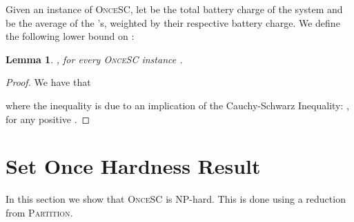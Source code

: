 \documentclass[11pt]{article}
\newtheorem{lemma}{Lemma}
\newcommand{\sosc}{\textsc{OnceSC}\xspace}
\newcommand{\partition}{\textsc{Partition}\xspace}
\begin{document}
Given an instance  of \sosc, let  be the
total battery charge of the system and  be the average of the 's, weighted by
their respective battery charge.  We define the following lower bound
on :


\begin{lemma}
\label{lemma:convex}
, for every \sosc instance .
\end{lemma}
\begin{proof}
We have that

where the inequality is due to 
an implication of the Cauchy-Schwarz Inequality: , for any
positive .
\end{proof}

\iffalse 

\begin{lemma}(Convexity)
Let , where  is the average of the
's in . Then .
\end{lemma}		
\begin{proof}
Let . Since  is a convex function,

See Figure \ref{fig:convexity} for an illustration.
\end{proof}

\fi 




\section{Set Once Hardness Result}
\label{sec:hardness}

In this section we show that \sosc is NP-hard.  This is done using a
reduction from \partition.
	
\end{document}
